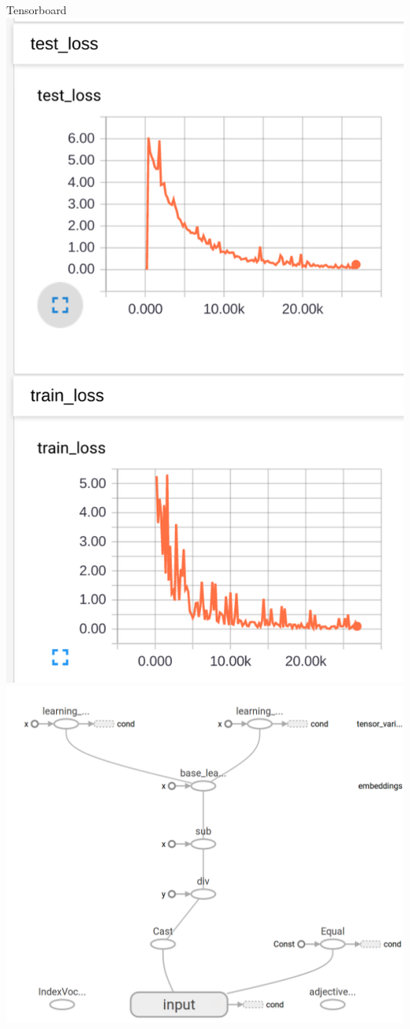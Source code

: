 \documentclass[mathserif]{beamer}
\begin{document}
\begin{frame}{Tensorboard}
	\includegraphics[scale=0.18]{tensorboard.png}
		\includegraphics[scale=0.14]{tensorboard-graph.png}

\end{frame}
\end{document}
